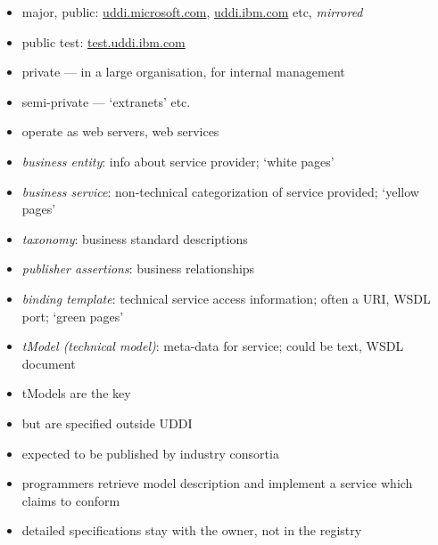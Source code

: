 \documentclass{sepslide-soa-faked} %
\begin{document}
\begin{slide}

	\begin{itemize}
	\item major, public: \url{uddi.microsoft.com},
	\url{uddi.ibm.com} etc,    \emph{mirrored}
	\item public test: \url{test.uddi.ibm.com}
	\item private --- in a large organisation, for internal
	management
	\item semi-private --- `extranets' etc.
\bigskip
	\item operate as web servers, web services
	\end{itemize}
\end{slide}

\begin{slide}

	\begin{itemize}
	\item \emph{business entity}: info about service provider; `white pages'
	\item \emph{business service}: non-technical categorization of
		service provided; `yellow pages'
	\item \emph{taxonomy}: business standard descriptions
	\item \emph{publisher assertions}: business relationships
	\item \emph{binding template}: technical service access information;
		often a URI, WSDL port; `green pages'
	\item \emph{tModel (technical model)}: meta-data for service;
		could be text, WSDL document 
	\end{itemize}
\end{slide}

\begin{slide}

	\begin{itemize}
	\item tModels are the key
	\item but are specified outside UDDI
	\item expected to be published by industry consortia
	\item programmers retrieve model description and implement
		a service which claims to conform
	\item detailed specifications stay with the owner,
		not in the registry
	\end{itemize}

\end{slide}
\end{document}
